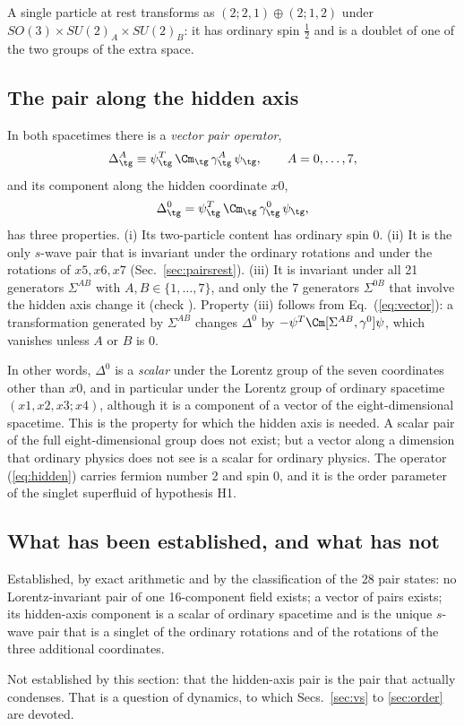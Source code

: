 A single particle at rest transforms as $(2;2,1)\oplus(2;1,2)$ under
$SO(3)\times SU(2)_A\times SU(2)_B$: it has ordinary spin $\tfrac12$ and is a doublet of one of the
two groups of the extra space.

\subsection{The pair along the hidden axis}
\label{sec:hiddenpair}

In both spacetimes there is a \emph{vector pair operator},
\begin{equation}
\Delta_{\tg}^{A}\equiv\psi_{\tg}^{T}\,\Cm_{\tg}\,\gamma_{\tg}^{A}\,\psi_{\tg},\qquad A=0,\dots,7,
\label{eq:vectorpair}
\end{equation}
and its component along the hidden coordinate $x0$,
\begin{equation}
\Delta_{\tg}^{0}=\psi_{\tg}^{T}\,\Cm_{\tg}\,\gamma_{\tg}^{0}\,\psi_{\tg},
\label{eq:hidden}
\end{equation}
has three properties. (i) Its two-particle content has ordinary spin 0. (ii) It is the only $s$-wave
pair that is invariant under the ordinary rotations and under the rotations of $x5,x6,x7$
(Sec.~\ref{sec:pairsrest}). (iii) It is invariant under all 21 generators $\Sigma^{AB}$ with
$A,B\in\{1,\dots,7\}$, and only the 7 generators $\Sigma^{0B}$ that involve the hidden axis change it
(check ). Property (iii) follows from Eq.~(\ref{eq:vector}): a
transformation generated by $\Sigma^{AB}$ changes $\Delta^{0}$ by
$-\psi^T\Cm[\Sigma^{AB},\gamma^0]\psi$, which vanishes unless $A$ or $B$ is 0.

In other words, $\Delta^{0}$ is a \emph{scalar} under the Lorentz group of the seven coordinates other
than $x0$, and in particular under the Lorentz group of ordinary spacetime $(x1,x2,x3;x4)$, although
it is a component of a vector of the eight-dimensional spacetime. This is the property for which the
hidden axis is needed. A scalar pair of the full eight-dimensional group does not exist; but a vector
along a dimension that ordinary physics does not see is a scalar for ordinary physics. The operator
(\ref{eq:hidden}) carries fermion number 2 and spin 0, and it is the order parameter of the singlet
superfluid of hypothesis H1.

\subsection{What has been established, and what has not}

Established, by exact arithmetic and by the classification of the 28 pair states: no
Lorentz-invariant pair of one 16-component field exists; a vector of pairs exists; its hidden-axis
component is a scalar of ordinary spacetime and is the unique $s$-wave pair that is a singlet of the
ordinary rotations and of the rotations of the three additional coordinates.

Not established by this section: that the hidden-axis pair is the pair that actually condenses. That
is a question of dynamics, to which Secs.~\ref{sec:vs} to \ref{sec:order} are devoted.
